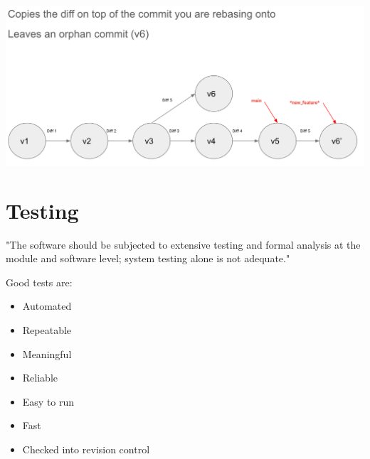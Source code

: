 \documentclass{article}
\begin{document}
\includegraphics*[width=\linewidth]{gitPruningTree.png}

\pagebreak

\section{Testing}

"The software should be subjected to extensive testing and formal analysis at the module and software level; system testing alone is not adequate."

\vspace*{1em}

Good tests are:
\begin{itemize}
    \item Automated
    \item Repeatable
    \item Meaningful
    \item Reliable
    \item Easy to run
    \item Fast 
    \item Checked into revision control
\end{itemize}
\end{document}
